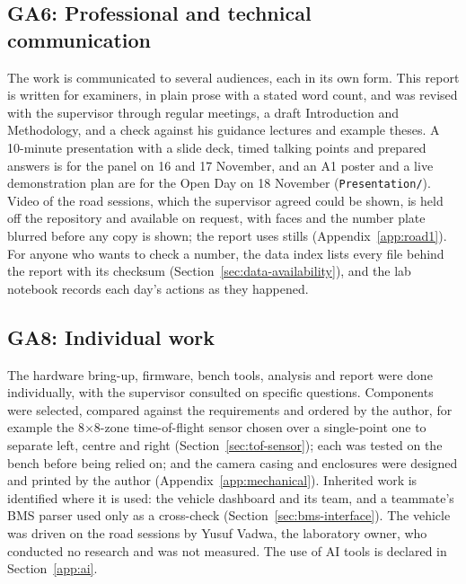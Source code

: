 \subsection*{GA6: Professional and technical communication}
The work is communicated to several audiences, each in its own form. This report is written for examiners, in plain prose with a stated word count, and was revised with the supervisor through regular meetings, a draft Introduction and Methodology, and a check against his guidance lectures and example theses. A 10-minute presentation with a slide deck, timed talking points and prepared answers is for the panel on 16 and 17 November, and an A1 poster and a live demonstration plan are for the Open Day on 18 November (\texttt{Presentation/}). Video of the road sessions, which the supervisor agreed could be shown, is held off the repository and available on request, with faces and the number plate blurred before any copy is shown; the report uses stills (Appendix~\ref{app:road1}). For anyone who wants to check a number, the data index lists every file behind the report with its checksum (Section~\ref{sec:data-availability}), and the lab notebook records each day's actions as they happened.

\subsection*{GA8: Individual work}
The hardware bring-up, firmware, bench tools, analysis and report were done individually, with the supervisor consulted on specific questions. Components were selected, compared against the requirements and ordered by the author, for example the 8$\times$8-zone time-of-flight sensor chosen over a single-point one to separate left, centre and right (Section~\ref{sec:tof-sensor}); each was tested on the bench before being relied on; and the camera casing and enclosures were designed and printed by the author (Appendix~\ref{app:mechanical}). Inherited work is identified where it is used: the vehicle dashboard and its team, and a teammate's BMS parser used only as a cross-check (Section~\ref{sec:bms-interface}). The vehicle was driven on the road sessions by Yusuf Vadwa, the laboratory owner, who conducted no research and was not measured. The use of AI tools is declared in Section~\ref{app:ai}.

